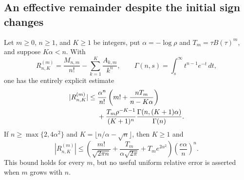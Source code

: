 \subsection{An effective remainder despite the initial sign changes}

\begin{theorem}\label{gam:thm:effective}
Let $m\ge0$, $n\ge1$, and $K\ge1$ be integers, put
$\alpha=-\log\rho$ and $T_m=\tau B(\tau)^m$, and suppose $K\alpha<n$.
With
\[
 R^{(m)}_{n,K}=\frac{M_{n,m}}{n!}
             -\sum_{k=1}^K\frac{A_{k,m}}{k^n},
 \qquad \Gamma(n,s)=\int_s^\infty t^{n-1}e^{-t}\,dt,
\]
one has the entirely explicit estimate
\begin{align}\label{gam:eq:effective}
 |R^{(m)}_{n,K}|\le{}&\frac{\alpha^n}{n!}
 \left(m!+\frac{nT_m}{n-K\alpha}\right)\notag\\
 &+\frac{T_m\rho^{-K-1}}{(K+1)^n}
          \frac{\Gamma(n,(K+1)\alpha)}{\Gamma(n)}.
\end{align}
If $n\ge\max\{2,4\alpha^2\}$ and
$K=\lfloor n/\alpha-\sqrt n\rfloor$, then $K\ge1$ and
\begin{equation}\label{gam:eq:optimized}
 |R^{(m)}_{n,K}|\le
 \left(\frac{m!}{\sqrt{2\pi n}}+
       \frac{T_m}{\alpha\sqrt{2\pi}}+T_m e^{2\alpha^2}\right)
 \left(\frac{e\alpha}{n}\right)^n.
\end{equation}
This bound holds for every $m$, but no useful uniform relative error is
asserted when $m$ grows with $n$.
\end{theorem}

